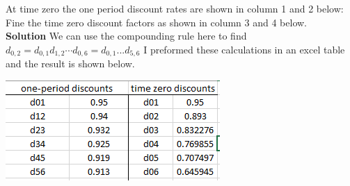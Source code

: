 \documentclass[12pt]{article}
\newenvironment{problem}[3][Problem]{\begin{trivlist}
\item[\hskip \labelsep {\bfseries #1}\hskip \labelsep {\bfseries #2.}]}{\end{trivlist}}
\begin{document}

\begin{problem}6. At time zero the one period discount rates are shown in column 1 and 2 below: Fine the time zero discount factors as shown in column 3 and 4 below. \\

\textbf{Solution}  We can use the compounding rule here to find $d_{0,2}=d_{0,1}d_{1,2} \cdots d_{0,6}=d_{0,1}...d_{5,6}$ I preformed these calculations in an excel table and the result is shown below. 
\begin{center}
\includegraphics[width=0.59\linewidth]{mod3p3.png}
\end{center}

\end{problem}
\end{document}
